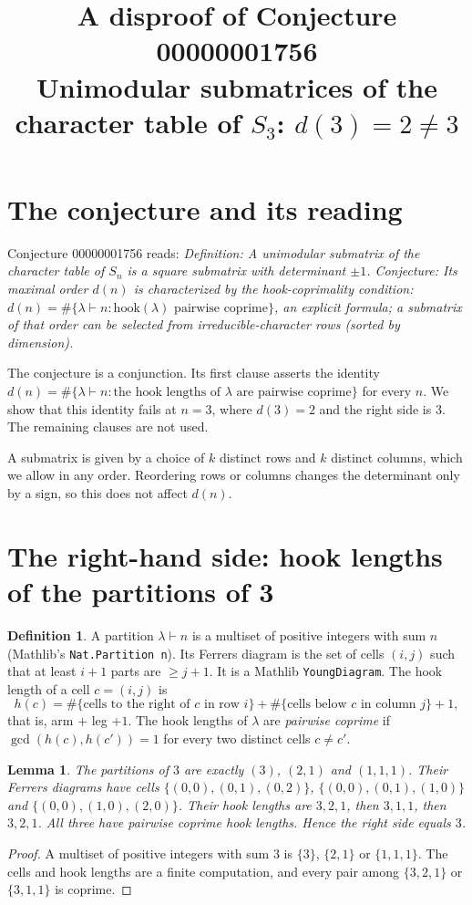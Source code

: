 \documentclass[11pt]{article}
\title{A disproof of Conjecture 00000001756\\[2pt]
\large Unimodular submatrices of the character table of $S_3$: $d(3)=2\ne 3$}
\date{}
\renewcommand{\_}{\oldus\allowbreak}
\newtheorem{lemma}[theorem]{Lemma}
\theoremstyle{definition}
\newtheorem{definition}[theorem]{Definition}
\theoremstyle{remark}
\begin{document}
\sloppy
\maketitle

\section{The conjecture and its reading}

Conjecture 00000001756 reads: \emph{Definition: A unimodular submatrix of the character table of $S_n$ is
a square submatrix with determinant $\pm1$. Conjecture: Its maximal order $d(n)$ is characterized by the
hook-coprimality condition: $d(n)=\#\{\lambda\vdash n:\mathrm{hook}(\lambda)\text{ pairwise coprime}\}$, an
explicit formula; a submatrix of that order can be selected from irreducible-character rows (sorted by
dimension).}

The conjecture is a conjunction. Its first clause asserts the identity
$d(n)=\#\{\lambda\vdash n:\text{the hook lengths of }\lambda\text{ are pairwise coprime}\}$ for every $n$.
We show that this identity fails at $n=3$, where $d(3)=2$ and the right side is $3$. The remaining clauses
are not used.

A submatrix is given by a choice of $k$ distinct rows and $k$ distinct columns, which we allow in any
order. Reordering rows or columns changes the determinant only by a sign, so this does not affect $d(n)$.

\section{The right-hand side: hook lengths of the partitions of 3}

\begin{definition}
A partition $\lambda\vdash n$ is a multiset of positive integers with sum $n$ (Mathlib's
\texttt{Nat.Partition n}). Its Ferrers diagram is the set of cells $(i,j)$ such that at least $i+1$ parts
are $\ge j+1$. It is a Mathlib \texttt{YoungDiagram}. The hook length of a cell $c=(i,j)$ is
\[
  h(c)=\#\{\text{cells to the right of }c\text{ in row }i\}+\#\{\text{cells below }c\text{ in column }j\}+1 ,
\]
that is, arm $+$ leg $+1$. The hook lengths of $\lambda$ are \emph{pairwise coprime} if
$\gcd(h(c),h(c'))=1$ for every two distinct cells $c\ne c'$.
\end{definition}

\begin{lemma}\label{lem:hooks}
The partitions of $3$ are exactly $(3)$, $(2,1)$ and $(1,1,1)$. Their Ferrers diagrams have cells
$\{(0,0),(0,1),(0,2)\}$, $\{(0,0),(0,1),(1,0)\}$ and $\{(0,0),(1,0),(2,0)\}$. Their hook lengths are
$3,2,1$, then $3,1,1$, then $3,2,1$. All three have pairwise coprime hook lengths. Hence the right side
equals $3$.
\end{lemma}
\begin{proof}
A multiset of positive integers with sum $3$ is $\{3\}$, $\{2,1\}$ or $\{1,1,1\}$. The cells and hook
lengths are a finite computation, and every pair among $\{3,2,1\}$ or $\{3,1,1\}$ is coprime.
\end{proof}
\end{document}
